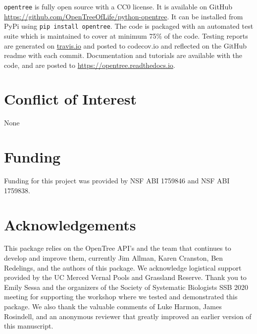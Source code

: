 \documentclass[oupdraft]{sysbio_sse}
\begin{document}
\texttt{opentree} is fully open source with a CC0 license. It is available on GitHub \url{ https://github.com/OpenTreeOfLife/python-opentree}. It can be installed from PyPi using \texttt{pip install opentree}. The code is packaged with an automated test suite which is maintained to cover at minimum 75\% of the code. Testing reports are generated on \url{travis.io} and posted to {codecov.io} and reflected on the GitHub readme with each commit. Documentation and tutorials are available with the code, and are posted to \url{https://opentree.readthedocs.io}.


\section{Conflict of Interest}
None

\section{Funding}
Funding for this project was provided by NSF ABI 1759846 and NSF ABI 1759838.

\section{Acknowledgements}
This package relies on the OpenTree API's and the team that continues to develop and improve them, currently Jim Allman, Karen Cranston, Ben Redelings, and the authors of this package. We acknowledge logistical support provided by the UC Merced Vernal Pools and Grassland Reserve.
Thank you to Emily Sessa and the organizers of the Society of Systematic Biologists SSB 2020 meeting for supporting the workshop where we tested and demonstrated this package.
We also thank the valuable comments of Luke Harmon, James Rosindell,
and an anonymous reviewer that greatly improved an earlier version of this manuscript.


\bigskip\bigskip
\end{document}

